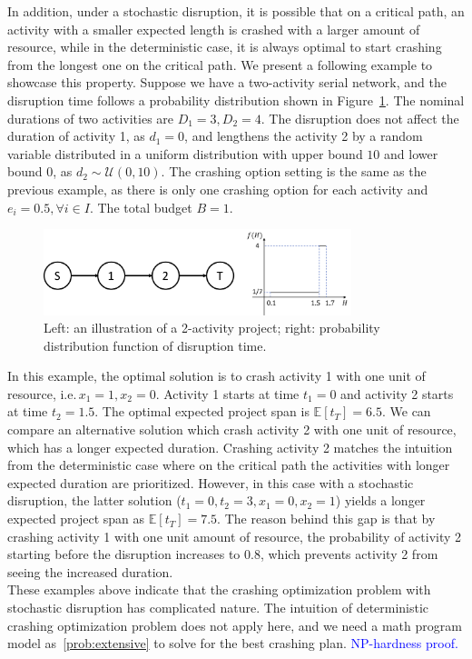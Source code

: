 \documentclass[11pt]{article}
\newcommand{\noi}{\noindent}
\begin{document}
	In addition, under a stochastic disruption, it is possible that on a critical path, an activity with a smaller expected length is crashed with a larger amount of resource, while in the deterministic case, it is always optimal to start crashing from the longest one on the critical path. We present a following example to showcase this property. Suppose we have a two-activity serial network, and the disruption time follows a probability distribution shown in Figure~\ref{fig:2act}. The nominal durations of two activities are \(D_1 = 3, D_2 = 4\). The disruption does not affect the duration of activity 1, as \(d_1 = 0\), and lengthens the activity 2 by a random variable distributed in a uniform distribution with upper bound \(10\) and lower bound \(0\), as \(d_2 \sim \mathcal{U}(0,10)\). The crashing option setting is the same as the previous example, as there is only one crashing option for each activity and \(e_i = 0.5, \forall i \in I\). The total budget \(B = 1\).
		\begin{figure}[H]
			\centering
			\includegraphics[width=0.8\textwidth]{2act}
			\caption{Left: an illustration of a 2-activity project; right: probability distribution function of disruption time.}
			\label{fig:2act}
		\end{figure}
	\noi In this example, the optimal solution is to crash activity 1 with one unit of resource, i.e.\,\(x_1 = 1, x_2 = 0\). Activity 1 starts at time \(t_1 = 0\) and activity 2 starts at time \(t_2 = 1.5\). The optimal expected project span is \(\mathbb{E}[t_T] = 6.5\). We can compare an alternative solution which crash activity 2 with one unit of resource, which has a longer expected duration. Crashing activity 2 matches the intuition from the deterministic case where on the critical path the activities with longer expected duration are prioritized. However, in this case with a stochastic disruption, the latter solution (\(t_1 = 0, t_2 = 3, x_1 = 0, x_2 = 1\)) yields a longer expected project span as \(\mathbb{E}[t_T] = 7.5\). The reason behind this gap is that by crashing activity 1 with one unit amount of resource, the probability of activity 2 starting before the disruption increases to \(0.8\), which prevents activity 2 from seeing the increased duration. \\
	\newline
	These examples above indicate that the crashing optimization problem with stochastic disruption has complicated nature. The intuition of deterministic crashing optimization problem does not apply here, and we need a math program model as~\eqref{prob:extensive} to solve for the best crashing plan.
	\textcolor{blue}{NP-hardness proof.}
	
\end{document}
